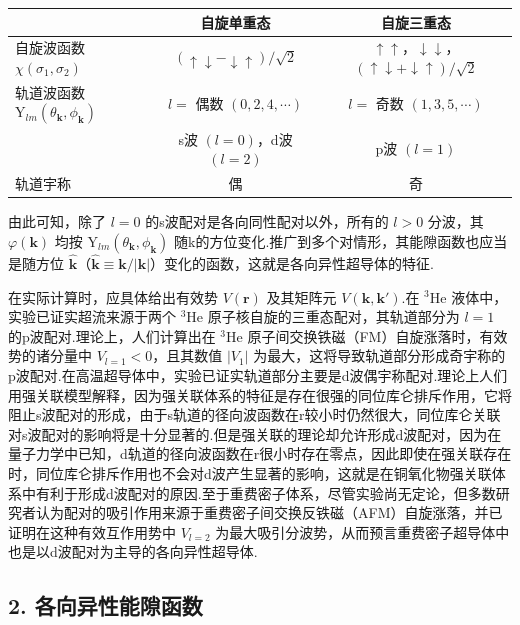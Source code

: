 \begin{center}\small
\begin{tabular}{lcc}
\hline
 & 自旋单重态 & 自旋三重态\\
\hline
自旋波函数 $\chi\left(\sigma_{1},\sigma_{2}\right)$ &
$\left(\uparrow\downarrow-\downarrow\uparrow\right)/\sqrt{2}$ &
$\uparrow\uparrow$，$\downarrow\downarrow$，$\left(\uparrow\downarrow+\downarrow\uparrow\right)/\sqrt{2}$\\
轨道波函数 $\mathrm{Y}_{lm}\left(\theta_{\boldsymbol{k}},\phi_{\boldsymbol{k}}\right)$ &
$l=$ 偶数 $\left(0,2,4,\cdots\right)$ & $l=$ 奇数 $\left(1,3,5,\cdots\right)$\\
 & s波 $\left(l=0\right)$，d波 $\left(l=2\right)$ & p波 $\left(l=1\right)$\\
\hline
轨道宇称 & 偶 & 奇\\
\hline
\end{tabular}
\end{center}

由此可知，除了 $l=0$ 的s波配对是各向同性配对以外，所有的 $l>0$ 分波，其 $\varphi(\boldsymbol{k})$ 均按 $\mathrm{Y}_{lm}\left(\theta_{\boldsymbol{k}},\phi_{\boldsymbol{k}}\right)$ 随k的方位变化.推广到多个对情形，其能隙函数也应当是随方位 $\hat{\boldsymbol{k}}$（$\hat{\boldsymbol{k}}\equiv\boldsymbol{k}/\left|\boldsymbol{k}\right|$）变化的函数，这就是各向异性超导体的特征.

在实际计算时，应具体给出有效势 $V(\boldsymbol{r})$ 及其矩阵元 $V\left(\boldsymbol{k},\boldsymbol{k}'\right)$.在 $^{3}\mathrm{He}$ 液体中，实验已证实超流来源于两个 $^{3}\mathrm{He}$ 原子核自旋的三重态配对，其轨道部分为 $l=1$ 的p波配对.理论上，人们计算出在 $^{3}\mathrm{He}$ 原子间交换铁磁（FM）自旋涨落时，有效势的诸分量中 $V_{l=1}<0$，且其数值 $\left|V_{1}\right|$ 为最大，这将导致轨道部分形成奇宇称的p波配对.在高温超导体中，实验已证实轨道部分主要是d波偶宇称配对.理论上人们用强关联模型解释，因为强关联体系的特征是存在很强的同位库仑排斥作用，它将阻止s波配对的形成，由于s轨道的径向波函数在r较小时仍然很大，同位库仑关联对s波配对的影响将是十分显著的.但是强关联的理论却允许形成d波配对，因为在量子力学中已知，d轨道的径向波函数在r很小时存在零点，因此即使在强关联存在时，同位库仑排斥作用也不会对d波产生显著的影响，这就是在铜氧化物强关联体系中有利于形成d波配对的原因.至于重费密子体系，尽管实验尚无定论，但多数研究者认为配对的吸引作用来源于重费密子间交换反铁磁（AFM）自旋涨落，并已证明在这种有效互作用势中 $V_{l=2}$ 为最大吸引分波势，从而预言重费密子超导体中也是以d波配对为主导的各向异性超导体.

\subsection*{2. 各向异性能隙函数}

